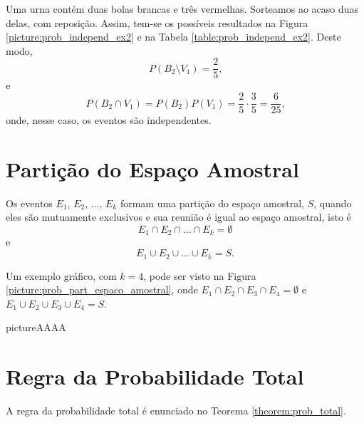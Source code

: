 \begin{example}
	Uma urna contém duas bolas brancas e três vermelhas. Sorteamos ao acaso duas delas, com reposição. Assim, tem-se os possíveis resultados na Figura \ref{picture:prob_independ_ex2} e na Tabela \ref{table:prob_independ_ex2}. Deste modo,
	\[
		P(B_2\setminus V_1)=\frac{2}{5}\text{,}
	\]
	e
	\[
		P(B_2\cap V_1)=P(B_2)P(V_1)=\frac{2}{5}\cdot \frac{3}{5}=\frac{6}{25}\text{,}
	\]
	onde, nesse caso, os eventos são independentes.
\end{example}

\section{Partição do Espaço Amostral}

Os eventos $E_1$, $E_2$, $\dots$, $E_k$ formam uma partição do espaço amostral, $S$, quando eles são mutuamente exclusivos e sua reunião é igual ao espaço amostral, isto é
\[
	E_1\cap E_2\cap \dots \cap E_k=\emptyset
\]
e
\[
	E_1\cup E_2\cup \dots \cup E_k=S\text{.}
\]

Um exemplo gráfico, com $k=4$, pode ser visto na Figura \ref{picture:prob_part_espaco_amostral}, onde $E_1\cap E_2 \cap E_3 \cap E_4=\emptyset$ e $E_1\cup E_2\cup E_3 \cup E_4=S$.

\begin{sidepicture}{0}{picture}{AAAA}
	\label{picture:prob_part_espaco_amostral}
\end{sidepicture}

\section{Regra da Probabilidade Total}

A regra da probabilidade total é enunciado no Teorema \ref{theorem:prob_total}.

